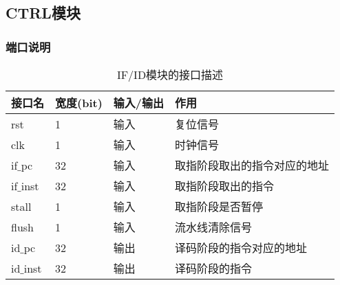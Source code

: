 \subsection{CTRL模块}
\subsubsection{端口说明}
\begin{table}[H]
	\centering
	\caption{IF/ID模块的接口描述}
	\begin{tabular}{|l|l|l|l|}
		\hline
		接口名 & 宽度(bit) & 输入/输出 & 作用 \\
		\hline
		rst & 1 & 输入 & 复位信号 \\
		\hline
		clk & 1 & 输入 & 时钟信号 \\
		\hline
		if$\_$pc & 32 & 输入 & 取指阶段取出的指令对应的地址 \\
		\hline
		if$\_$inst & 32 & 输入 & 取指阶段取出的指令 \\
		\hline
		stall & 1 & 输入 & 取指阶段是否暂停 \\
		\hline
		flush & 1 & 输入 & 流水线清除信号 \\
		\hline
		id$\_$pc & 32 & 输出 & 译码阶段的指令对应的地址 \\
		\hline
		id$\_$inst & 32 & 输出 & 译码阶段的指令 \\
		\hline
	\end{tabular}
\end{table}
